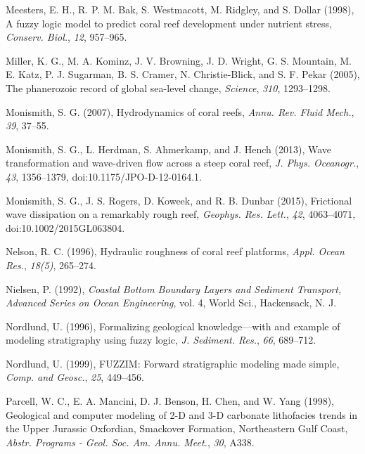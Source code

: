 \documentclass[default,jgrga]{agutex2015}
\begin{document}
\begin{article}
\begin{thebibliography}{}
Meesters, E. H., R. P. M. Bak, S. Westmacott, M. Ridgley, and S. Dollar (1998), A fuzzy logic model to predict coral reef development under nutrient stress, \textit{Conserv. Biol.}, \textit{12}, 957--965.

Miller, K. G., M. A. Kominz, J. V. Browning, J. D. Wright, G. S. Mountain, M. E. Katz, P. J. Sugarman, B. S. Cramer, N. Christie-Blick, and S. F. Pekar (2005), The phanerozoic record of global sea-level change, \textit{Science}, \textit{310}, 1293--1298.

Monismith, S. G. (2007), Hydrodynamics of coral reefs, \textit{Annu. Rev. Fluid Mech.}, \textit{39}, 37--55.

Monismith, S. G., L. Herdman, S. Ahmerkamp, and J. Hench (2013), Wave transformation and wave-driven flow across a steep coral reef, \textit{J. Phys. Oceanogr.}, \textit{43}, 1356--1379, doi:10.1175/JPO-D-12-0164.1.

Monismith, S. G., J. S. Rogers, D. Koweek, and R. B. Dunbar (2015), Frictional wave dissipation on a remarkably rough reef, \textit{Geophys. Res. Lett.}, \textit{42}, 4063--4071, doi:10.1002/2015GL063804.

Nelson, R. C. (1996), Hydraulic roughness of coral reef platforms, \textit{Appl. Ocean Res.}, \textit{18(5)}, 265--274.

Nielsen, P. (1992), \textit{Coastal Bottom Boundary Layers and Sediment Transport, Advanced Series on Ocean Engineering}, vol. 4, World Sci., Hackensack, N. J.

Nordlund, U. (1996), Formalizing geological knowledge—with and example of modeling stratigraphy using fuzzy logic, \textit{J. Sediment. Res.}, \textit{66}, 689--712.

Nordlund, U. (1999), FUZZIM: Forward stratigraphic modeling made simple, \textit{Comp. and Geosc.}, \textit{25}, 449--456.

Parcell, W. C., E. A. Mancini, D. J. Benson, H. Chen, and W. Yang (1998), Geological and computer modeling of 2-D and 3-D carbonate lithofacies trends in the Upper Jurassic Oxfordian, Smackover Formation, Northeastern Gulf Coast, \textit{Abstr. Programs - Geol. Soc. Am. Annu. Meet.}, \textit{30}, A338.


\end{thebibliography}
\end{article}
\end{document}
